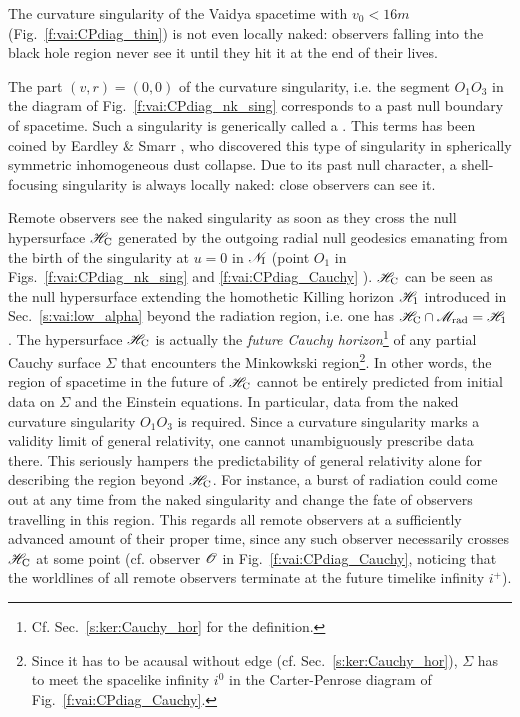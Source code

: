 \begin{remark}
The curvature singularity of the Vaidya spacetime with $v_0 < 16 m$ (Fig.~\ref{f:vai:CPdiag_thin})
is not even locally naked: observers falling into the black hole region never see
it until they hit it at the end of their lives.
\end{remark}

The part  $(v, r) = (0, 0)$ of the curvature singularity, i.e. the segment $O_1 O_3$ in
the diagram of Fig.~\ref{f:vai:CPdiag_nk_sing} corresponds to a past null boundary of
spacetime.
Such a singularity is generically called a
. This terms has been coined by Eardley \& Smarr \cite{EardlS79}, who discovered this type of singularity
in spherically symmetric inhomogeneous dust collapse.
Due to its past null character, a shell-focusing singularity is always locally naked: close observers can see it.



Remote observers see the naked singularity as soon as they cross
the null hypersurface $\mathscr{H}_{\rm C}$ generated by the outgoing radial null geodesics
emanating from the birth of the singularity at $u=0$ in $\mathscr{N}_{\rm I}$
(point $O_1$ in Figs.~\ref{f:vai:CPdiag_nk_sing} and \ref{f:vai:CPdiag_Cauchy} ).
$\mathscr{H}_{\rm C}$ can be seen as the null hypersurface extending the
homothetic Killing horizon $\mathscr{H}_1$ introduced in Sec.~\ref{s:vai:low_alpha}
beyond the radiation region, i.e. one has
$\mathscr{H}_{\rm C} \cap \mathscr{M}_{\rm rad} = \mathscr{H}_1$.
The hypersurface $\mathscr{H}_{\rm C}$ is actually the \emph{future Cauchy horizon}\footnote{Cf. Sec.~\ref{s:ker:Cauchy_hor} for the definition.}
of any partial Cauchy surface $\Sigma$ that encounters the Minkowkski region\footnote{Since it
has to be acausal without edge (cf. Sec.~\ref{s:ker:Cauchy_hor}), $\Sigma$ has to meet the spacelike infinity $i^0$
in the Carter-Penrose diagram of Fig.~\ref{f:vai:CPdiag_Cauchy}.}.
In other words, the region of spacetime in the future of $\mathscr{H}_{\rm C}$ cannot
be entirely predicted from initial data on $\Sigma$ and the Einstein equations.
In particular, data from the naked curvature singularity $O_1 O_3$ is required.
Since a curvature singularity marks a validity limit of general relativity,
one cannot unambiguously prescribe data there. This seriously hampers the
predictability of general relativity alone for describing the region
beyond $\mathscr{H}_{\rm C}$. For instance, a burst of radiation could come
out at any time from the naked singularity and change the fate of observers
travelling in this region. This regards all remote observers at a sufficiently
advanced amount of their proper time, since any such observer necessarily crosses
$\mathscr{H}_{\rm C}$ at some point (cf. observer $\mathscr{O}$ in Fig.~\ref{f:vai:CPdiag_Cauchy},
noticing that the worldlines of all remote observers
terminate at the future timelike infinity $i^+$).



